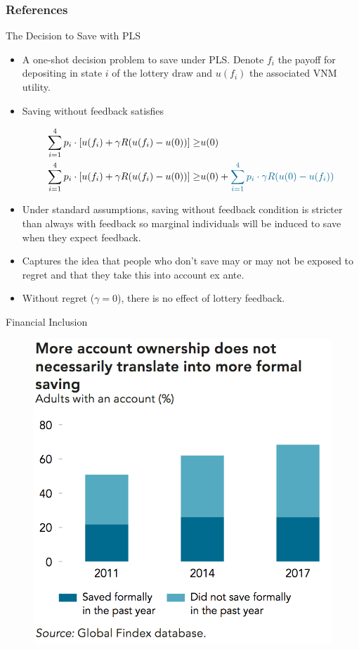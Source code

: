 \documentclass[aspectratio=169]{beamer}
\begin{document}
\begin{frame}[allowframebreaks] \frametitle{References}

	\printbibliography

\end{frame}

\appendix

\begin{frame}{The Decision to Save with PLS}

	\begin{itemize}

		\item A one-shot decision problem to save under PLS. Denote $f_i$ the payoff for depositing in state $i$ of the lottery draw and $u(f_i)$ the associated VNM utility. 
	
		\item Saving without feedback satisfies

		\begin{align}
			\sum_{i=1}^4 p_i \cdot [u(f_i) + \gamma R(u(f_i) - u(0))] \geq & u(0) \\
			\sum_{i=1}^4 p_i \cdot [u(f_i) + \gamma R(u(f_i) - u(0))] \geq & u(0) + \textcolor{Triton}{ \sum_{i=1}^4 p_i \cdot \gamma R(u(0) - u(f_i)) }
		\end{align}

		\item Under standard assumptions, saving without feedback condition is stricter than always with feedback so marginal individuals will be induced to save when they expect feedback.

		\item Captures the idea that people who don't save may or may not be exposed to regret and that they take this into account ex ante.

		\item Without regret ($\gamma = 0$), there is no effect of lottery feedback.

	\end{itemize}

\end{frame}

\begin{frame}{Financial Inclusion}

	\begin{figure}[H]
		\centering
		\includegraphics[width=0.45\linewidth]{fig-findex.png}
	\end{figure}

\end{frame}
\end{document}
